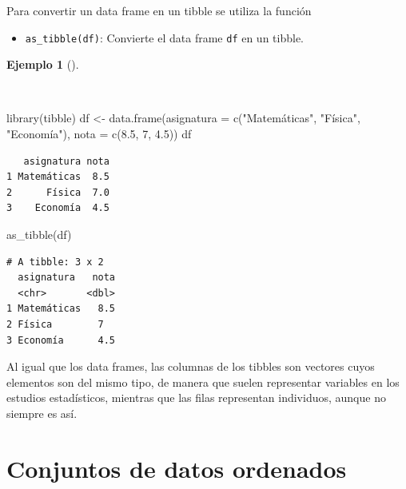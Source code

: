 \documentclass[
  spanish,
  a4paper,
]{scrreport}
\newenvironment{Shaded}{\begin{snugshade}}{\end{snugshade}}
\newcommand{\AttributeTok}[1]{\textcolor[rgb]{0.40,0.45,0.13}{#1}}
\newcommand{\DecValTok}[1]{\textcolor[rgb]{0.68,0.00,0.00}{#1}}
\newcommand{\FloatTok}[1]{\textcolor[rgb]{0.68,0.00,0.00}{#1}}
\newcommand{\FunctionTok}[1]{\textcolor[rgb]{0.28,0.35,0.67}{#1}}
\newcommand{\NormalTok}[1]{\textcolor[rgb]{0.00,0.23,0.31}{#1}}
\newcommand{\OtherTok}[1]{\textcolor[rgb]{0.00,0.23,0.31}{#1}}
\newcommand{\StringTok}[1]{\textcolor[rgb]{0.13,0.47,0.30}{#1}}
\providecommand{\tightlist}{%
  \setlength{\itemsep}{0pt}\setlength{\parskip}{0pt}}
\theoremstyle{definition}
\theoremstyle{definition}
\newtheorem{example}{Ejemplo}[chapter]
\theoremstyle{remark}
\begin{document}
Para convertir un data frame en un tibble se utiliza la función

\begin{itemize}
\tightlist
\item
  \texttt{as\_tibble(df)}: Convierte el data frame \texttt{df} en un
  tibble.
\end{itemize}

\begin{example}[]\protect\hypertarget{exm-creacion-tibble}{}\label{exm-creacion-tibble}

~

\begin{Shaded}
\begin{Highlighting}[]
\FunctionTok{library}\NormalTok{(tibble)}
\NormalTok{df }\OtherTok{\textless{}{-}} \FunctionTok{data.frame}\NormalTok{(}\AttributeTok{asignatura =} \FunctionTok{c}\NormalTok{(}\StringTok{"Matemáticas"}\NormalTok{, }\StringTok{"Física"}\NormalTok{, }\StringTok{"Economía"}\NormalTok{), }\AttributeTok{nota =} \FunctionTok{c}\NormalTok{(}\FloatTok{8.5}\NormalTok{, }\DecValTok{7}\NormalTok{, }\FloatTok{4.5}\NormalTok{))}
\NormalTok{df}
\end{Highlighting}
\end{Shaded}

\begin{verbatim}
   asignatura nota
1 Matemáticas  8.5
2      Física  7.0
3    Economía  4.5
\end{verbatim}

\begin{Shaded}
\begin{Highlighting}[]
\FunctionTok{as\_tibble}\NormalTok{(df)}
\end{Highlighting}
\end{Shaded}

\begin{verbatim}
# A tibble: 3 x 2
  asignatura   nota
  <chr>       <dbl>
1 Matemáticas   8.5
2 Física        7  
3 Economía      4.5
\end{verbatim}

\end{example}

Al igual que los data frames, las columnas de los tibbles son vectores
cuyos elementos son del mismo tipo, de manera que suelen representar
variables en los estudios estadísticos, mientras que las filas
representan individuos, aunque no siempre es así.

\section{Conjuntos de datos
ordenados}\label{conjuntos-de-datos-ordenados}
\end{document}
